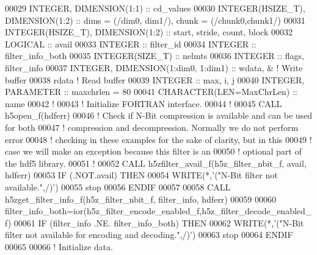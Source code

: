 \begin{DoxyCode}
00029   \textcolor{keywordtype}{INTEGER}, \textcolor{keywordtype}{DIMENSION(1:1)} :: cd\_values
00030   \textcolor{keywordtype}{INTEGER(HSIZE\_T)}, \textcolor{keywordtype}{DIMENSION(1:2)}   :: dims = (/dim0, dim1/), chunk = (/chunk0,chunk1/)
00031   \textcolor{keywordtype}{INTEGER(HSIZE\_T)}, \textcolor{keywordtype}{DIMENSION(1:2)}   :: start, stride, count, block
00032   \textcolor{keywordtype}{LOGICAL} :: avail
00033   \textcolor{keywordtype}{INTEGER} :: filter\_id
00034   \textcolor{keywordtype}{INTEGER} :: filter\_info\_both
00035   \textcolor{keywordtype}{INTEGER(SIZE\_T)} :: nelmts
00036   \textcolor{keywordtype}{INTEGER} :: flags, filter\_info
00037   \textcolor{keywordtype}{INTEGER}, \textcolor{keywordtype}{DIMENSION(1:dim0, 1:dim1)} :: wdata, & \textcolor{comment}{! Write buffer }
00038                                         rdata    \textcolor{comment}{! Read buffer}
00039   \textcolor{keywordtype}{INTEGER} :: max, i, j
00040   \textcolor{keywordtype}{INTEGER}, \textcolor{keywordtype}{PARAMETER} :: maxchrlen = 80
00041   \textcolor{keywordtype}{CHARACTER(LEN=MaxChrLen)} :: name
00042   \textcolor{comment}{!}
00043   \textcolor{comment}{! Initialize FORTRAN interface.}
00044   \textcolor{comment}{!}
00045   \textcolor{keyword}{CALL }h5open\_f(hdferr)
00046   \textcolor{comment}{! Check if N-Bit compression is available and can be used for both}
00047   \textcolor{comment}{! compression and decompression.  Normally we do not perform error}
00048   \textcolor{comment}{! checking in these examples for the sake of clarity, but in this}
00049   \textcolor{comment}{! case we will make an exception because this filter is an}
00050   \textcolor{comment}{! optional part of the hdf5 library.}
00051   \textcolor{comment}{!}
00052   \textcolor{keyword}{CALL }h5zfilter\_avail\_f(h5z\_filter\_nbit\_f, avail, hdferr)
00053   \textcolor{keywordflow}{IF} (.NOT.avail) \textcolor{keywordflow}{THEN}
00054      \textcolor{keyword}{WRITE}(*,\textcolor{stringliteral}{'("N-Bit filter not available.",/)'})
00055      stop
00056 \textcolor{keywordflow}{  ENDIF}
00057 
00058   \textcolor{keyword}{CALL }h5zget\_filter\_info\_f(h5z\_filter\_nbit\_f, filter\_info, hdferr)
00059 
00060   filter\_info\_both=ior(h5z\_filter\_encode\_enabled\_f,h5z\_filter\_decode\_enabled\_f)
00061   \textcolor{keywordflow}{IF} (filter\_info .NE. filter\_info\_both) \textcolor{keywordflow}{THEN}
00062      \textcolor{keyword}{WRITE}(*,\textcolor{stringliteral}{'("N-Bit filter not available for encoding and decoding.",/)'})
00063      stop
00064 \textcolor{keywordflow}{  ENDIF}
00065 
00066   \textcolor{comment}{! Initialize data.}

\end{DoxyCode}
